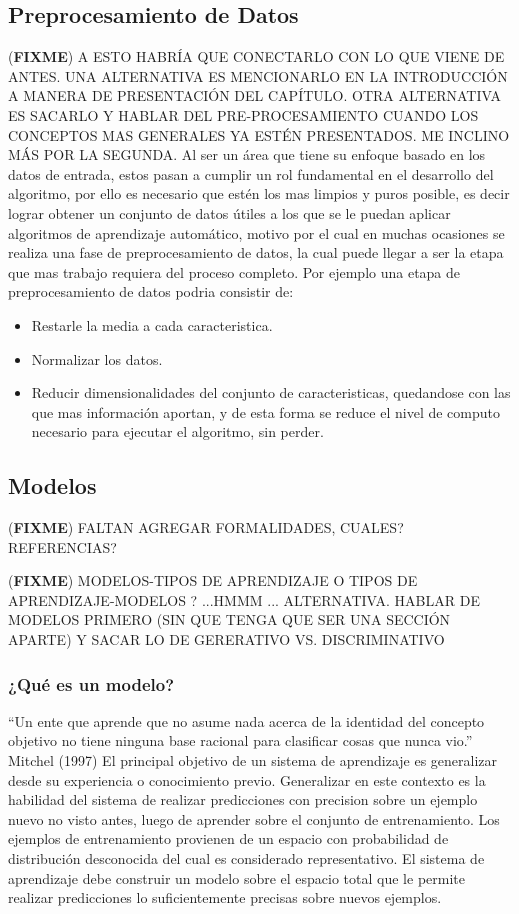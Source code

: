 \documentclass[a4paper,11pt,spanish]{book}
\newcommand*{\FIXME}[1]{{(\textbf{FIXME}) {#1}}}
\begin{document}
        \subsection{Preprocesamiento de Datos}
        \FIXME{A ESTO HABRÍA QUE CONECTARLO CON LO QUE VIENE DE ANTES. UNA
          ALTERNATIVA ES MENCIONARLO EN LA INTRODUCCIÓN A MANERA DE PRESENTACIÓN
        DEL CAPÍTULO. OTRA ALTERNATIVA ES SACARLO Y HABLAR DEL PRE-PROCESAMIENTO
        CUANDO LOS CONCEPTOS MAS GENERALES YA ESTÉN PRESENTADOS. ME INCLINO MÁS
        POR LA SEGUNDA.}
      Al ser un área que tiene su enfoque basado en los datos de entrada, estos pasan a cumplir un rol fundamental en el desarrollo del algoritmo, por ello es necesario que
      estén los mas limpios y puros posible, es decir lograr obtener un conjunto de datos útiles a los que se le puedan aplicar algoritmos de aprendizaje automático,
      motivo por el cual en muchas ocasiones se realiza una fase de preprocesamiento de datos, la cual puede llegar a ser la etapa que mas trabajo requiera del proceso completo.
      Por ejemplo una etapa de preprocesamiento de datos podria consistir de:
      \begin{itemize}
       \item Restarle la media a cada caracteristica.
       \item Normalizar los datos.
       \item Reducir dimensionalidades del conjunto de caracteristicas, quedandose con las que mas información aportan, y de esta forma se reduce el nivel de computo necesario para
	ejecutar el algoritmo, sin perder.
      \end{itemize}

    \subsection{Modelos}
    \FIXME{FALTAN AGREGAR FORMALIDADES, CUALES? REFERENCIAS?}

    \FIXME{MODELOS-TIPOS DE APRENDIZAJE O TIPOS DE APRENDIZAJE-MODELOS ? ...HMMM
      ... ALTERNATIVA. HABLAR DE MODELOS PRIMERO (SIN QUE TENGA QUE SER UNA
      SECCIÓN APARTE) Y SACAR LO DE GERERATIVO VS. DISCRIMINATIVO}
      \subsubsection{¿Qué es un modelo?}
	“Un ente que aprende que no asume nada acerca de la identidad del concepto objetivo no tiene ninguna base racional para clasificar cosas que nunca vio.”
	Mitchel (1997)
	El principal objetivo de un sistema de aprendizaje es generalizar desde su experiencia o conocimiento previo. Generalizar en este contexto es la habilidad del sistema de realizar
	predicciones con precision sobre un ejemplo nuevo no visto antes, luego de aprender sobre el conjunto de entrenamiento. Los ejemplos de entrenamiento provienen de un espacio
	con probabilidad de distribución desconocida del cual es considerado representativo. El sistema de aprendizaje debe construir un modelo sobre el espacio total que le permite realizar
	predicciones lo suficientemente precisas sobre nuevos ejemplos.
\end{document}
